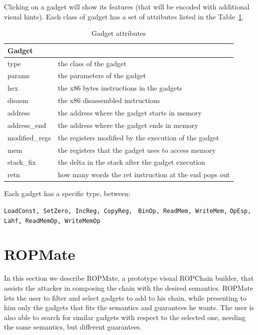 \documentclass[twocolumn, 11pt]{article}
\begin{document}
Clicking on a gadget will show its features (that will be encoded with additional visual hints). Each class of gadget has a set of attributes listed in the Table~\ref{tab:gad_attr}.

\bigskip

\begin{table}[htb]
\caption{Gadget attributes}\label{tab:gad_attr}
\centering
  \begin{tabular}{|l|l|}
    \hline
    \textbf{Gadget} & \\ \hline
    type & the class of the gadget \\ \hline
    params & the parameters of the gadget \\ \hline
    hex & the x86 bytes instructions in the gadgets \\ \hline
    disasm & the x86 disassembled instructions \\ \hline
    address & the address where the gadget starts in memory \\ \hline
    address\_end & the address where the gadget ends in memory \\ \hline
    modified\_regs & the registers modified by the execution of the gadget \\ \hline
    mem & the registers that the gadget uses to access memory \\ \hline
    stack\_fix & the delta in the stack after the gadget execution \\ \hline
    retn & how many words the ret instruction at the end pops out \\ \hline
  \end{tabular}
\end{table}

\bigskip
Each gadget has a specific type, between:

\begin{center}
\noindent\texttt{LoadConst, SetZero, IncReg, CopyReg, }
\noindent\texttt{BinOp, ReadMem, WriteMem,}
\noindent\texttt{OpEsp, Lahf, ReadMemOp, WriteMemOp}
\end{center}

\section{ROPMate}
In this section we describe ROPMate, a prototype visual ROPChain builder, that assists the attacker in composing the chain with the desired semantics. ROPMate lets the user to filter and select gadgets to add to his chain, while presenting to him only the gadgets that fits the semantics and guarantees he wants. The user is also able to search for similar gadgets with respect to the selected one, needing the same semantics, but different guarantees.
\end{document}
